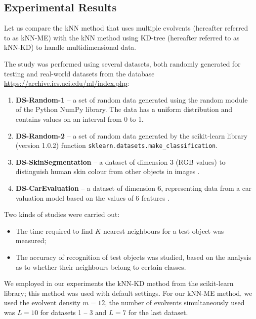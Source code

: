 \documentclass[entropy,article,submit,moreauthors,pdftex]{Definitions/mdpi}
\begin{document}
\begin{paracol}{2}
\section{Experimental Results}\label{results}

Let us compare the kNN method that uses multiple evolvents (hereafter referred to as kNN-ME) with the kNN method using KD-tree (hereafter referred to as kNN-KD) \cite{Hou2018} to handle multidimensional data.

The study was performed using several datasets, both randomly generated for testing and real-world  datasets from the database \url{https://archive.ics.uci.edu/ml/index.php}:
\begin{enumerate}
\item
\textbf{DS-Random-1} -- a set of random data generated using the random module of the Python NumPy library. The data has a uniform distribution and contains values on an interval from 0 to 1.

\item
\textbf{DS-Random-2} -- a set of random data generated by the scikit-learn library (version 1.0.2) function \texttt{sklearn.datasets.make\_classification}.

\item
\textbf{DS-SkinSegmentation} -- a dataset of dimension 3 (RGB values) to distinguish human skin colour from other objects in images \cite{ds-1}.

\item
\textbf{DS-CarEvaluation} -- a dataset of dimension 6, representing data from a car valuation model based on the values of 6 features \cite{ds-2}.
\end{enumerate}

Two kinds of studies were carried out:
\begin{itemize}
\item The time required to find $K$ nearest neighbours for a test object was measured;
\item The accuracy of recognition of test objects was studied, based on the analysis as to whether their neighbours belong to certain classes.
\end{itemize}

We employed in our experiments the kNN-KD method from the scikit-learn library; this method was used with default settings. For our kNN-ME method, we used the evolvent density $m=12$, the number of evolvents simultaneously used was $L=10$ for datasets 1 -- 3 and $L=7$ for the last dataset.


\end{paracol}
\end{document}
